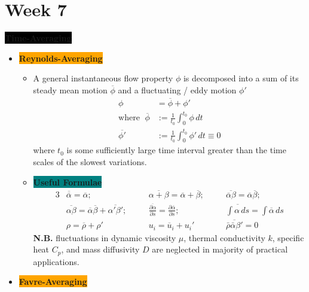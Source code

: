 \section{Week 7}

\colorbox{black}{\textbf{\color{white}Time-Averaging}}

\begin{itemize}
    \item \colorbox{orange}{\textbf{\color{white}Reynolds-Averaging}}
    \begin{itemize}
        \item A general instantaneous flow property $\phi$ is decomposed into a sum of its steady mean motion $\overline{\phi}$ and a fluctuating / eddy motion $\phi '$
        \begin{align*}
            \phi &= \overline{\phi} + \phi ' \\
            \text{where }\; \overline{\phi} &:= \frac{1}{t_0} \int_{0}^{t_0} \phi \, dt \\
            \overline{\phi '} &:= \frac{1}{t_0} \int_{0}^{t_0} \phi ' \, dt \equiv 0 
        \end{align*}
        where $t_0$ is some sufficiently large time interval greater than the time scales of the slowest variations.
        \item \colorbox{teal}{\textbf{\color{white}Useful Formulae}}
        \begin{alignat*}{3}
            & \overline{\overline{\alpha}} = \overline{\alpha}; \quad && \overline{\alpha+\beta}= \overline{\alpha} + \overline{\beta}; \quad && \overline{\overline{\alpha}\beta} = \overline{\alpha}\overline{\beta}; \\
            & \overline{\alpha \beta} = \overline{\alpha}\overline{\beta} + \overline{\alpha ' \beta '}; \quad && \frac{\overline{\partial \alpha}}{\partial s} = \frac{\partial \overline{\alpha}}{\partial s}; \quad && \overline{\int \alpha \, ds} = \int \overline{\alpha} \, ds \\
            & \rho = \overline{\rho}+ \rho ' \quad && u_i = \overline{u}_i + u_i ' \quad && \overline{\bar{\rho} \bar{\alpha} \beta '} = 0
        \end{alignat*}
        \textbf{\color{red}N.B.} fluctuations in dynamic viscosity $\mu$, thermal conductivity $k$, specific heat $C_p$, and mass diffusivity $D$ are neglected in majority of practical applications.
    \end{itemize}
    \item \colorbox{orange}{\textbf{\color{white}Favre-Averaging}}

\end{itemize}
